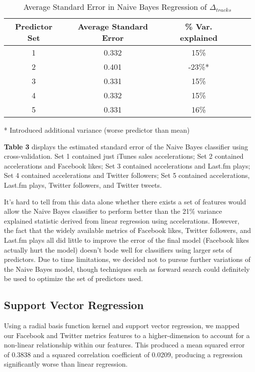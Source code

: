 \documentclass[conference]{IEEEtran}
\begin{document}
{\begin{table}[!t]
\renewcommand{\arraystretch}{1.1}
\caption{Average Standard Error in Naive Bayes Regression of $\Delta_{tracks}$}
\label{std_error_lin_reg}
\centering
\begin{tabular}{|c|c|c|c|c|}
\hline
Predictor Set & Average Standard Error & \% Var. explained\\
\hline
1 & 0.332 & 15\%\\
\hline
2 & 0.401 & -23\%*\\
\hline
3 & 0.331 & 15\%\\
\hline
4 & 0.332 & 15\%\\
\hline
5 & 0.331 & 16\%\\
\hline
\end{tabular}

* Introduced additional variance (worse predictor than mean)
\end{table}

\textbf{Table 3} displays the estimated standard error of the Naive Bayes classifier using cross-validation. Set 1 contained just iTunes sales accelerations; Set 2 contained accelerations and Facebook likes; Set 3 contained accelerations and Last.fm plays; Set 4 contained accelerations and Twitter followers; Set 5 contained accelerations, Last.fm plays, Twitter followers, and Twitter tweets.

It's hard to tell from this data alone whether there exists a set of features would allow the Naive Bayes classifier to perform better than the 21\% variance explained statistic derived from linear regression using accelerations. However, the fact that the widely available metrics of Facebook likes, Twitter followers, and Last.fm plays all did little to improve the error of the final model (Facebook likes actually hurt the model) doesn't bode well for classifiers using larger sets of predictors. Due to time limitations, we decided not to pursue further variations of the Naive Bayes model, though techniques such as forward search could definitely be used to optimize the set of predictors used.

\subsection{Support Vector Regression}
Using a radial basis function kernel and support vector regression, we mapped our Facebook and Twitter metrics features to a higher-dimension to account for a non-linear relationship within our features. This produced a mean squared error of 0.3838 and a squared correlation coefficient of 0.0209, producing a regression significantly worse than linear regression.

}
\end{document}
